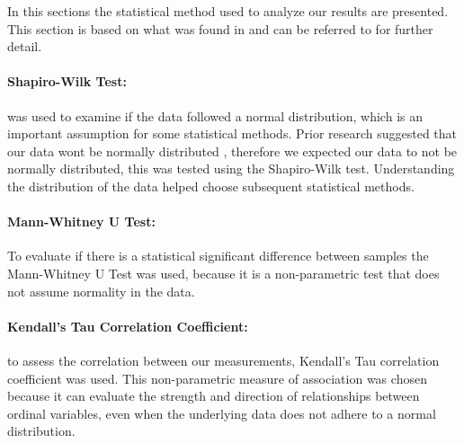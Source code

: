 In this sections the statistical method used to analyze our results are presented. This section is based on what was found in \cite{biksbois} and can be referred to for further detail. %

\paragraph{Shapiro-Wilk Test:} was used to examine if the data followed a normal distribution, which is an important assumption for some statistical methods. Prior research suggested that our data wont be normally distributed \cite{biksbois}, therefore we expected our data to not be normally distributed, this was tested using the Shapiro-Wilk test. Understanding the distribution of the data helped choose subsequent statistical methods.\cite{razali2011power}

\paragraph{Mann-Whitney U Test:}
To evaluate if there is a statistical significant difference between samples the Mann-Whitney U Test was used, because it is a non-parametric test that does not assume normality in the data.\cite{mann1947test}


\paragraph{Kendall's Tau Correlation Coefficient:}
to assess the correlation between our measurements, Kendall's Tau correlation coefficient was used. This non-parametric measure of association was chosen because it can evaluate the strength and direction of relationships between ordinal variables, even when the underlying data does not adhere to a normal distribution.\cite{han1987non} %

